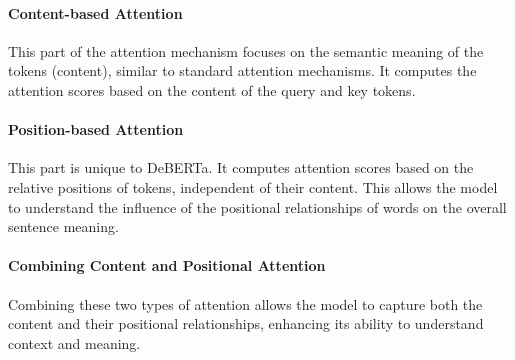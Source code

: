\paragraph{Content-based Attention} This part of the attention mechanism focuses on the semantic meaning of the \glspl{token} (content), similar to standard attention mechanisms.
It computes the attention scores based on the content of the query and key \glspl{token}.
\paragraph{Position-based Attention} This part is unique to DeBERTa. It computes attention scores based on the relative positions of \glspl{token}, independent of their content. This allows the model to understand the influence of the positional relationships of words on the overall sentence meaning.

\paragraph{Combining Content and Positional Attention} Combining these two types of attention allows the model to capture both the content and their positional relationships, enhancing its ability to understand context and meaning.%
